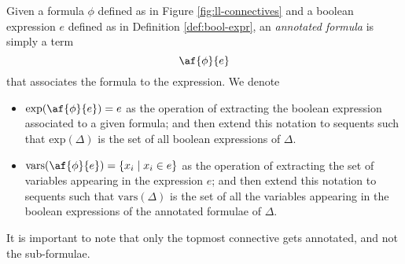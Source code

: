 \begin{define}
	\label{def:annotated}
	Given a formula $\phi$ defined as in Figure \ref{fig:ll-connectives} and a boolean expression $e$ defined as in Definition \ref{def:bool-expr}, an \textit{annotated formula} is simply a term 
	$$ \af{\phi}{e} $$
	that associates the formula to the expression.
	We denote 
	\begin{itemize}
		\item $ \mathrm{exp}(\af{\phi}{e}) = e $
			as the operation of extracting the boolean expression associated to a given formula; and then extend this notation to sequents such that $ \mathrm{exp}(\Delta) $ is the set of all boolean expressions of $\Delta$.
		\item $\mathrm{vars}(\af{\phi}{e}) = \{ x_i \mid x_i \in e \} $
			as the operation of extracting the set of variables appearing in the expression $e$; and then extend this notation to sequents such that $ \mathrm{vars}(\Delta)$ is the set of all the variables appearing in the boolean expressions of the annotated formulae of $\Delta$.
	\end{itemize}
\end{define}
It is important to note that only the topmost connective gets annotated, and not the sub-formulae.


